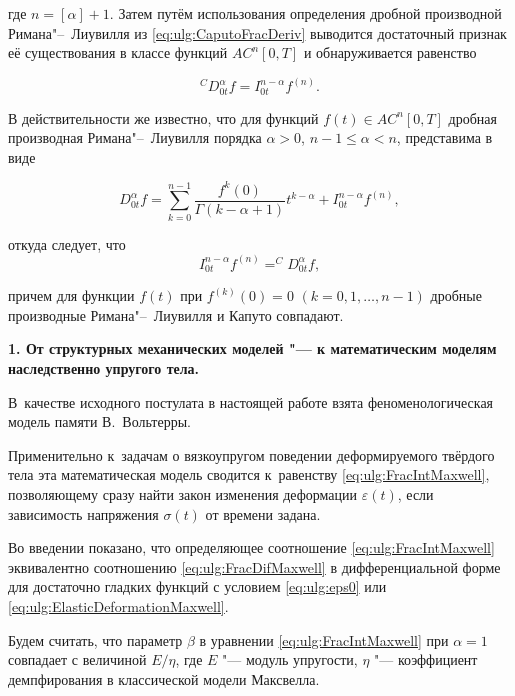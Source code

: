 где $n=[\alpha]+1$. Затем путём использования определения дробной производной Римана"--~Лиувилля из \eqref{eq:ulg:CaputoFracDeriv} выводится достаточный признак её существования в классе функций $AC^{n}[0,T]$ и обнаруживается равенство

\begin{equation}\label{eq:ulg:CaputoIntegral}

^{C}D^{\alpha}_{0t}f=I^{n-\alpha}_{0t}f^{(n)}.

\end{equation}

В действительности же известно, что для функций $f(t)\in AC^{n}[0, T]$ дробная производная Римана"--~Лиувилля порядка  $\alpha>0$, $n-1\leq\alpha<n$, представима в виде \cite[с.~46]{ulg:bib:S-K-M}

\begin{equation}\label{eq:ulg:FracDerivRimLi}

D^{\alpha}_{0t}f=\sum^{n-1}_{k=0}\frac{f^{k}(0)}{\Gamma(k-\alpha+1)}t^{k-\alpha}+I^{n-\alpha}_{0t}f^{(n)},

\end{equation}

откуда следует, что $$I^{n-\alpha}_{0t}f^{(n)}=^{C}D^{\alpha}_{0t}f,$$ 

причем для функции $f(t)$ при $f^{(k)}(0)=0$ $(k=0, 1,\dots , n-1)$ дробные производные Римана"--~Лиувилля и Капуто совпадают.



\smallskip



{\bf1. От структурных механических моделей "---  к математическим моделям наследственно упругого тела.} 

В~качестве исходного постулата в настоящей работе взята феноменологическая модель памяти В.~Вольтерры. 

Применительно к~задачам о вязкоупругом поведении деформируемого твёрдого тела эта математическая модель сводится к~равенству \eqref{eq:ulg:FracIntMaxwell}, позволяющему сразу найти закон изменения деформации $\varepsilon(t)$, если зависимость напряжения $\sigma(t)$ от времени задана. 

Во введении показано, что определяющее соотношение \eqref{eq:ulg:FracIntMaxwell} эквивалентно соотношению \eqref{eq:ulg:FracDifMaxwell} в дифференциальной форме для достаточно гладких функций с условием \eqref{eq:ulg:eps0} или \eqref{eq:ulg:ElasticDeformationMaxwell}.



Будем считать, что параметр $\beta$ в уравнении \eqref{eq:ulg:FracIntMaxwell} при $\alpha=1$ совпадает с величиной ${E}/{\eta}$, где $E$ "---  модуль упругости, $\eta$ "---  коэффициент демпфирования в классической модели Максвелла. 

